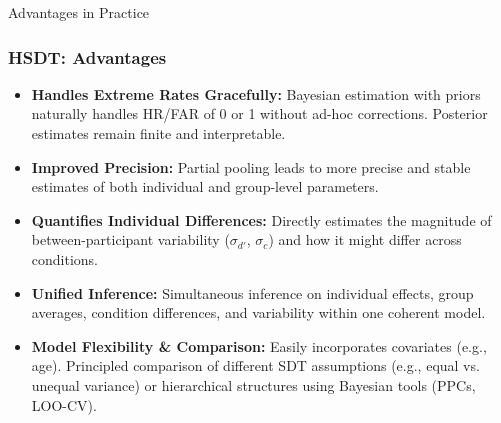 \documentclass[aspectratio=169]{beamer}
\begin{document}
\begin{frame}{Advantages in Practice}
    \frametitle{HSDT: Advantages}
    \begin{itemize}
        \item \textbf{Handles Extreme Rates Gracefully:}
            Bayesian estimation with priors naturally handles HR/FAR of 0 or 1 without ad-hoc corrections. Posterior estimates remain finite and interpretable.
        \pause
        \item \textbf{Improved Precision:}
            Partial pooling leads to more precise and stable estimates of both individual and group-level parameters.
        \pause
        \item \textbf{Quantifies Individual Differences:}
            Directly estimates the magnitude of between-participant variability ($\sigma_{d'}$, $\sigma_{c}$) and how it might differ across conditions.
        \pause
        \item \textbf{Unified Inference:}
            Simultaneous inference on individual effects, group averages, condition differences, and variability within one coherent model.
        \pause
        \item \textbf{Model Flexibility \& Comparison:}
            Easily incorporates covariates (e.g., age). Principled comparison of different SDT assumptions (e.g., equal vs. unequal variance) or hierarchical structures using Bayesian tools (PPCs, LOO-CV).
    \end{itemize}
\end{frame}
\end{document}
